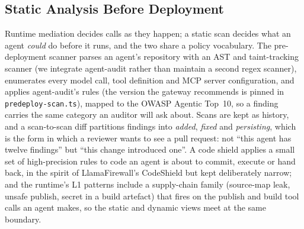 \subsection{Static Analysis Before Deployment}
\label{sec:predeploy}

Runtime mediation decides calls as they happen; a static scan decides
what an agent \emph{could} do before it runs, and the two share a policy
vocabulary. The pre-deployment scanner parses an agent's repository with
an AST and taint-tracking scanner (we integrate agent-audit rather than
maintain a second regex scanner), enumerates every model call, tool
definition and MCP server configuration, and applies agent-audit's rules (the version the gateway recommends is pinned in \texttt{predeploy-scan.ts}), mapped to the OWASP Agentic Top~10, so a finding carries the same category an
auditor will ask about. Scans are kept as history, and a scan-to-scan
diff partitions findings into \emph{added}, \emph{fixed} and
\emph{persisting}, which is the form in which a reviewer wants to see a
pull request: not ``this agent has twelve findings'' but ``this change
introduced one''. A code shield applies a small set of high-precision
rules to code an agent is about to commit, execute or hand back, in the
spirit of LlamaFirewall's CodeShield but kept deliberately narrow; and
the runtime's L1 patterns include a supply-chain family (source-map leak,
unsafe publish, secret in a build artefact) that fires on the publish and
build tool calls an agent makes, so the static and dynamic views meet
at the same boundary.
